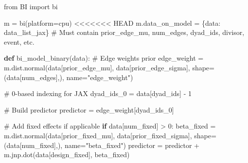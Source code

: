 \documentclass[
  letterpaper,
  DIV=11,
  numbers=noendperiod]{scrartcl}
\newenvironment{Shaded}{\begin{snugshade}}{\end{snugshade}}
\newcommand{\CommentTok}[1]{\textcolor[rgb]{0.37,0.37,0.37}{#1}}
\newcommand{\ControlFlowTok}[1]{\textcolor[rgb]{0.00,0.23,0.31}{\textbf{#1}}}
\newcommand{\DecValTok}[1]{\textcolor[rgb]{0.68,0.00,0.00}{#1}}
\newcommand{\ImportTok}[1]{\textcolor[rgb]{0.00,0.46,0.62}{#1}}
\newcommand{\KeywordTok}[1]{\textcolor[rgb]{0.00,0.23,0.31}{\textbf{#1}}}
\newcommand{\NormalTok}[1]{\textcolor[rgb]{0.00,0.23,0.31}{#1}}
\newcommand{\OperatorTok}[1]{\textcolor[rgb]{0.37,0.37,0.37}{#1}}
\newcommand{\StringTok}[1]{\textcolor[rgb]{0.13,0.47,0.30}{#1}}
\begin{document}
\begin{Shaded}
\begin{Highlighting}[]
\ImportTok{from}\NormalTok{ BI }\ImportTok{import}\NormalTok{ bi}

\NormalTok{m }\OperatorTok{=}\NormalTok{ bi(platform}\OperatorTok{=}\StringTok{\textquotesingle{}cpu\textquotesingle{}}\NormalTok{)}
\OperatorTok{\textless{}\textless{}\textless{}\textless{}\textless{}\textless{}\textless{}}\NormalTok{ HEAD}
\NormalTok{m.data\_on\_model }\OperatorTok{=}\NormalTok{ \{}\StringTok{\textquotesingle{}data\textquotesingle{}}\NormalTok{: data\_list\_jax\} }\CommentTok{\# Must contain \textquotesingle{}prior\_edge\_mu\textquotesingle{}, \textquotesingle{}num\_edges\textquotesingle{}, \textquotesingle{}dyad\_ids\textquotesingle{}, \textquotesingle{}divisor\textquotesingle{}, \textquotesingle{}event\textquotesingle{}, etc.}

\KeywordTok{def}\NormalTok{ bi\_model\_binary(data):}
    \CommentTok{\# Edge weights prior}
\NormalTok{    edge\_weight }\OperatorTok{=}\NormalTok{ m.dist.normal(data[}\StringTok{\textquotesingle{}prior\_edge\_mu\textquotesingle{}}\NormalTok{], data[}\StringTok{\textquotesingle{}prior\_edge\_sigma\textquotesingle{}}\NormalTok{], }
\NormalTok{                                shape}\OperatorTok{=}\NormalTok{(data[}\StringTok{\textquotesingle{}num\_edges\textquotesingle{}}\NormalTok{],), name}\OperatorTok{=}\StringTok{"edge\_weight"}\NormalTok{)}
    
    \CommentTok{\# 0{-}based indexing for JAX}
\NormalTok{    dyad\_ids\_0 }\OperatorTok{=}\NormalTok{ data[}\StringTok{\textquotesingle{}dyad\_ids\textquotesingle{}}\NormalTok{] }\OperatorTok{{-}} \DecValTok{1}
    
    \CommentTok{\# Build predictor}
\NormalTok{    predictor }\OperatorTok{=}\NormalTok{ edge\_weight[dyad\_ids\_0]}
    
    \CommentTok{\# Add fixed effects if applicable}
    \ControlFlowTok{if}\NormalTok{ data[}\StringTok{\textquotesingle{}num\_fixed\textquotesingle{}}\NormalTok{] }\OperatorTok{\textgreater{}} \DecValTok{0}\NormalTok{:}
\NormalTok{        beta\_fixed }\OperatorTok{=}\NormalTok{ m.dist.normal(data[}\StringTok{\textquotesingle{}prior\_fixed\_mu\textquotesingle{}}\NormalTok{], data[}\StringTok{\textquotesingle{}prior\_fixed\_sigma\textquotesingle{}}\NormalTok{], }
\NormalTok{                                   shape}\OperatorTok{=}\NormalTok{(data[}\StringTok{\textquotesingle{}num\_fixed\textquotesingle{}}\NormalTok{],), name}\OperatorTok{=}\StringTok{"beta\_fixed"}\NormalTok{)}
\NormalTok{        predictor }\OperatorTok{=}\NormalTok{ predictor }\OperatorTok{+}\NormalTok{ m.jnp.dot(data[}\StringTok{\textquotesingle{}design\_fixed\textquotesingle{}}\NormalTok{], beta\_fixed)}
    

\end{Highlighting}
\end{Shaded}
\end{document}

